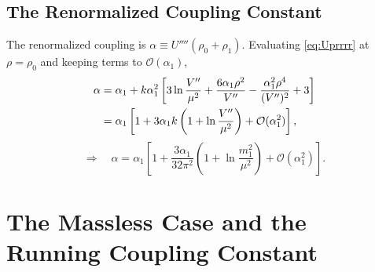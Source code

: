 \subsection*{The Renormalized Coupling Constant}

The renormalized coupling is $\alpha \equiv U''''(\rho_0+\rho_1)$.
Evaluating \eqref{eq:Uprrrr} at $\rho=\rho_0$ and keeping terms to
$\mathcal{O}(\alpha_1)$,
\begin{align}
    \alpha &= \alpha_1 + k\alpha_1^2\left[3\ln\frac{V''}{\mu^2}
    + \frac{6\alpha_1\rho^2}{V''}
    - \frac{\alpha_1^2\rho^4}{(V'')^2} + 3\right] \notag\\
    &= \alpha_1\left[1 + 3\alpha_1 k\left(1
    + \ln\frac{V''}{\mu^2}\right)
    + \mathcal{O}(\alpha_1^2)\right],
\end{align}
\begin{equation}
    \Rightarrow\quad\boxed{\alpha = \alpha_1\left[1
    + \frac{3\alpha_1}{32\pi^2}\left(1
    + \ln\frac{m_1^2}{\mu^2}\right)
    + \mathcal{O}(\alpha_1^2)\right].}
\end{equation}

\section{The Massless Case and the Running Coupling Constant}

